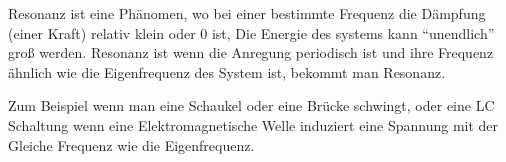 %
\par Resonanz ist eine Phänomen, wo bei einer bestimmte Frequenz die Dämpfung (einer Kraft) relativ klein oder 0 ist, Die Energie des systems kann \enquote{unendlich} groß werden. Resonanz ist wenn die Anregung periodisch ist und ihre Frequenz ähnlich wie die Eigenfrequenz des System ist, bekommt man Resonanz.
\par Zum Beispiel wenn man eine Schaukel oder eine Brücke schwingt, oder eine LC Schaltung wenn eine Elektromagnetische Welle induziert eine Spannung mit der Gleiche Frequenz wie die Eigenfrequenz. 

%
%
\begin{flushright}
  \textit{\autorA}
\end{flushright}
%
%
%
